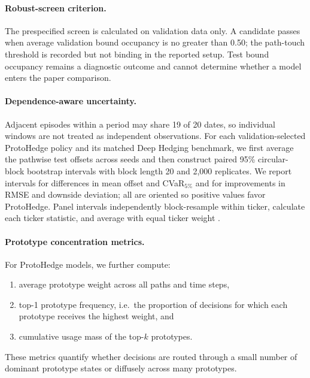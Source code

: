 \documentclass[sigconf]{acmart}
\begin{document}
\paragraph{Robust-screen criterion.}
The prespecified screen is calculated on validation data only. A candidate
passes when average validation bound occupancy is no greater than 0.50; the
path-touch threshold is recorded but not binding in the reported setup. Test
bound occupancy remains a diagnostic outcome and cannot determine whether a
model enters the paper comparison.

\paragraph{Dependence-aware uncertainty.}
Adjacent episodes within a period may share 19 of 20 dates, so individual
windows are not treated as independent observations. For each
validation-selected ProtoHedge policy and its matched Deep Hedging benchmark,
we first average the pathwise test offsets across seeds and then construct
paired 95\% circular-block bootstrap intervals with block length 20 and 2,000
replicates. We report intervals for differences in mean offset and
CVaR$_{5\%}$ and for improvements in RMSE and downside deviation; all are
oriented so positive values favor ProtoHedge. Panel intervals independently
block-resample within ticker, calculate each ticker statistic, and average
with equal ticker weight \cite{politis1992}.

\paragraph{Prototype concentration metrics.}
For ProtoHedge models, we further compute:
\begin{enumerate}
    \item average prototype weight across all paths and time steps,
    \item top-1 prototype frequency, i.e.\ the proportion of decisions for which each prototype receives the highest weight, and
    \item cumulative usage mass of the top-$k$ prototypes.
\end{enumerate}
These metrics quantify whether decisions are routed through a small number of dominant prototype states or diffusely across many prototypes.
\end{document}
